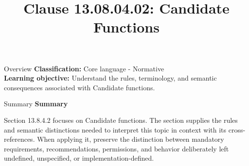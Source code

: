 \documentclass[10pt,letterpaper]{article}
\title{Clause 13.08.04.02: Candidate Functions}
\author{}
\date{}
\begin{document}
\maketitle
\begin{CornellOverviewBox}{Overview}
\textbf{Classification:} Core language - Normative\\[2pt]
\textbf{Learning objective:} Understand the rules, terminology, and semantic consequences associated with Candidate functions.
\end{CornellOverviewBox}\begin{CornellSummaryBox}{Summary}
{\sffamily\bfseries\color{Accent} Summary}\par\vspace{3pt}Section 13.8.4.2 focuses on Candidate functions. The section supplies the rules and semantic distinctions needed to interpret this topic in context with its cross-references. When applying it, preserve the distinction between mandatory requirements, recommendations, permissions, and behavior deliberately left undefined, unspecified, or implementation-defined.
\end{CornellSummaryBox}
\end{document}
